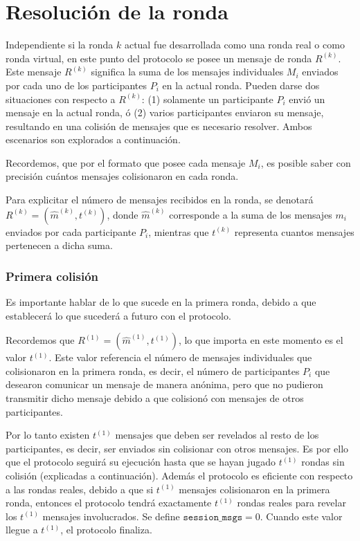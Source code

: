 \section{Resolución de la ronda}

Independiente si la ronda $k$ actual fue desarrollada como una ronda real o como ronda virtual, en este punto del protocolo se posee un mensaje de ronda $R^{(k)}$. Este mensaje $R^{(k)}$ significa la suma de los mensajes individuales $M_i$ enviados por cada uno de los participantes $P_i$ en la actual ronda. Pueden darse dos situaciones con respecto a $R^{(k)}$: (1) solamente un participante $P_i$ envió un mensaje en la actual ronda, ó (2) varios participantes enviaron su mensaje, resultando en una colisión de mensajes que es necesario resolver. Ambos escenarios son explorados a continuación.

Recordemos, que por el formato que posee cada mensaje $M_i$, es posible saber con precisión cuántos mensajes colisionaron en cada ronda.


Para explicitar el número de mensajes recibidos en la ronda, se denotará $R^{(k)} = (\hat{m}^{(k)}, t^{(k)})$, donde $\hat{m}^{(k)}$ corresponde a la suma de los mensajes $m_i$ enviados por cada participante $P_i$, mientras que $t^{(k)}$ representa cuantos mensajes pertenecen a dicha suma.

\subsubsection{Primera colisión}

Es importante hablar de lo que sucede en la primera ronda, debido a que establecerá lo que sucederá a futuro con el protocolo.

Recordemos que $R^{(1)} = (\hat{m}^{(1)}, t^{(1)})$, lo que importa en este momento es el valor $t^{(1)}$. Este valor referencia el número de mensajes individuales que colisionaron en la primera ronda, es decir, el número de participantes $P_i$ que desearon comunicar un mensaje de manera anónima, pero que no pudieron transmitir dicho mensaje debido a que colisionó con mensajes de otros participantes.

Por lo tanto existen $t^{(1)}$ mensajes que deben ser revelados al resto de los participantes, es decir, ser enviados sin colisionar con otros mensajes. Es por ello que el protocolo seguirá su ejecución hasta que se hayan jugado $t^{(1)}$ rondas sin colisión (explicadas a continuación). Además el protocolo es eficiente con respecto a las rondas reales, debido a que si $t^{(1)}$ mensajes colisionaron en la primera ronda, entonces el protocolo tendrá exactamente $t^{(1)}$ rondas reales para revelar los $t^{(1)}$ mensajes involucrados. Se define $\mathtt{session\_msgs} = 0$. Cuando este valor llegue a $t^{(1)}$, el protocolo finaliza.

